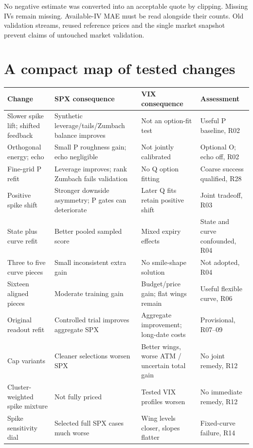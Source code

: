 \documentclass[11pt,a4paper]{article}
\begin{document}
No negative estimate was converted into an acceptable quote by clipping. Missing IVs remain missing. Available-IV MAE must be read alongside their counts. Old validation streams, reused reference prices and the single market snapshot prevent claims of untouched market validation.

\section{A compact map of tested changes}
\small
\begin{longtable}{@{}>{\raggedright\arraybackslash}p{.22\linewidth}>{\raggedright\arraybackslash}p{.25\linewidth}>{\raggedright\arraybackslash}p{.25\linewidth}>{\raggedright\arraybackslash}p{.20\linewidth}@{}}
\toprule Change & SPX consequence & VIX consequence & Assessment\\\midrule\endhead
Slower spike lift; shifted feedback & Synthetic leverage/tails/Zumbach balance improves & Not an option-fit test & Useful P baseline, R02\\
Orthogonal energy; echo & Small P roughness gain; echo negligible & Not jointly calibrated & Optional O; echo off, R02\\
Fine-grid P refit & Leverage improves; rank Zumbach fails validation & No Q option fitting & Coarse success qualified, R28\\
Positive spike shift & Stronger downside asymmetry; P gates can deteriorate & Later Q fits retain positive shift & Joint tradeoff, R03\\
State plus curve refit & Better pooled sampled score & Mixed expiry effects & State and curve confounded, R04\\
Three to five curve pieces & Small inconsistent extra gain & No smile-shape solution & Not adopted, R04\\
Sixteen aligned pieces & Moderate training gain & Budget/price gain; flat wings remain & Useful flexible curve, R06\\
Original readout refit & Controlled trial improves aggregate SPX & Aggregate improvement; long-date costs & Provisional, R07--09\\
Cap variants & Cleaner selections worsen SPX & Better wings, worse ATM / uncertain total gain & No joint remedy, R12\\
Cluster-weighted spike mixture & Not fully priced & Tested VIX profiles worsen & No immediate remedy, R12\\
Spike sensitivity dial & Selected full SPX cases much worse & Wing levels closer, slopes flatter & Fixed-curve failure, R14\\

\end{longtable}
\end{document}

